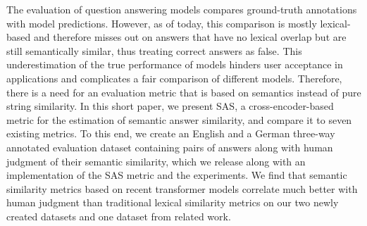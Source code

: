 The evaluation of question answering models compares ground-truth annotations with model predictions. However, as of today, this comparison is mostly lexical-based and therefore misses out on answers that have no lexical overlap but are still semantically similar, thus treating correct answers as false. This underestimation of the true performance of models hinders user acceptance in applications and complicates a fair comparison of different models. Therefore, there is a need for an evaluation metric that is based on semantics instead of pure string similarity. In this short paper, we present SAS, a cross-encoder-based metric for the estimation of semantic answer similarity, and compare it to seven existing metrics. To this end, we create an English and a German three-way annotated evaluation dataset containing pairs of answers along with human judgment of their semantic similarity, which we release along with an implementation of the SAS metric and the experiments. We find that semantic similarity metrics based on recent transformer models correlate much better with human judgment than traditional lexical similarity metrics on our two newly created datasets and one dataset from related work.
